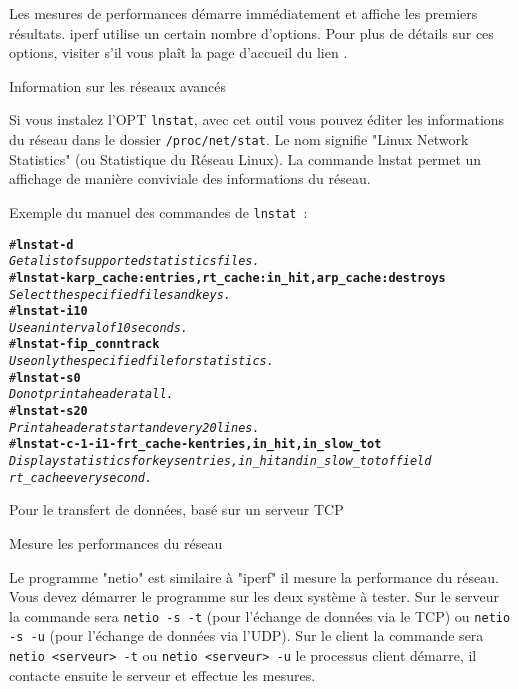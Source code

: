 \begin{description}
    Les mesures de performances démarre immédiatement et affiche les premiers
    résultats. iperf utilise un certain nombre d'options. Pour plus de détails
    sur ces options, visiter s'il vous plaît la page d'accueil du lien
    .

 Information sur les réseaux avancés

    Si vous instalez l'OPT \texttt{lnstat}, avec cet outil vous pouvez éditer les informations
	du réseau dans le dossier \texttt{/proc/net/stat}. Le nom signifie "Linux Network Statistics"
	(ou Statistique du Réseau Linux). La commande lnstat permet un affichage de manière conviviale
	des informations du réseau.

	Exemple du manuel des commandes de \texttt{lnstat}~:

    \begin{example}
    \begin{alltt}
    \# \textbf{lnstat -d}
        \textsl{Get a list of supported statistics files.}
    \# \textbf{lnstat -k arp_cache:entries,rt_cache:in_hit,arp_cache:destroys}
        \textsl{Select the specified files and keys.}
    \# \textbf{lnstat -i 10}
        \textsl{Use an interval of 10 seconds.}
    \# \textbf{lnstat -f ip_conntrack}
        \textsl{Use only the specified file for statistics.}
    \# \textbf{lnstat -s 0}
        \textsl{Do not print a header at all.}
    \# \textbf{lnstat -s 20}
        \textsl{Print a header at start and every 20 lines.}
    \# \textbf{lnstat -c -1 -i 1 -f rt_cache -k entries,in_hit,in_slow_tot}
        \textsl{Display statistics for keys entries, in_hit and in_slow_tot of field
        rt_cache every second.}
    \end{alltt}
    \end{example}

 Pour le transfert de données, basé sur un serveur TCP

 Mesure les performances du réseau

    Le programme "netio" est similaire à "iperf" il mesure la performance du réseau.
	Vous devez démarrer le programme sur les deux système à tester. Sur le serveur
	la commande sera \verb+netio -s -t+ (pour l'échange de données via le TCP) ou
	\verb+netio -s -u+ (pour l'échange de données via l'UDP). Sur le client la commande
	sera \verb+netio <serveur> -t+ ou \verb+netio <serveur> -u+ le processus client
	démarre, il contacte ensuite le serveur et effectue les mesures.


\end{description}
